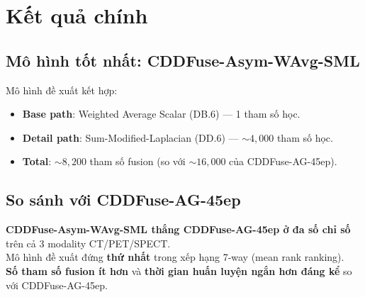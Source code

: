 \documentclass[12pt,a4paper]{article}
\begin{document}
\section{Kết quả chính}

\subsection{Mô hình tốt nhất: CDDFuse-Asym-WAvg-SML}

Mô hình đề xuất kết hợp:
\begin{itemize}\itemsep0pt
    \item \textbf{Base path}: Weighted Average Scalar (DB.6) --- 1 tham số học.
    \item \textbf{Detail path}: Sum-Modified-Laplacian (DD.6) --- $\sim 4{,}000$ tham số học.
    \item \textbf{Total}: $\sim 8{,}200$ tham số fusion (so với $\sim 16{,}000$ của CDDFuse-AG-45ep).
\end{itemize}

\subsection{So sánh với CDDFuse-AG-45ep}

\begin{tcolorbox}[colback=green!5,colframe=green!50,title=\textbf{Kết quả head-to-head}]
\textbf{CDDFuse-Asym-WAvg-SML thắng CDDFuse-AG-45ep ở đa số chỉ số} trên cả 3 modality CT/PET/SPECT.\\
Mô hình đề xuất đứng \textbf{thứ nhất} trong xếp hạng 7-way (mean rank ranking).\\
\textbf{Số tham số fusion ít hơn} và \textbf{thời gian huấn luyện ngắn hơn đáng kể} so với CDDFuse-AG-45ep.
\end{tcolorbox}
\end{document}
